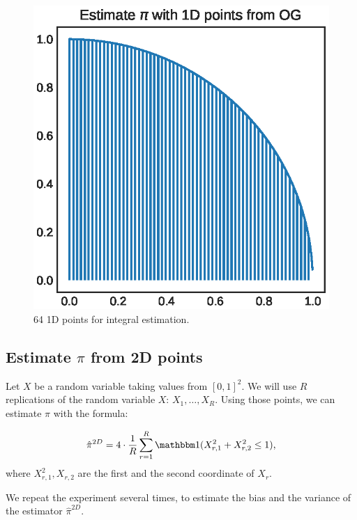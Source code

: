 \documentclass[shortabstract]{iithesis}
\begin{document}
\begin{figure}[!ht]
    \includegraphics[scale=.6]{OG_1D_circle.eps}
    \caption{64 1D points for integral estimation.}
    \label{fig:toy-points2}
\end{figure}





\newpage

\subsection{Estimate $\pi$ from 2D points}


Let $X$ be a random variable taking values from $[0,  1]^2$. We will use $R$ replications of the random variable $X$: $X_1,  \ldots, X_R$. Using those points, we can estimate $\pi$ with the formula:

\begin{equation*}
    \hat{\pi}^{2D} =  4 \cdot \frac 1 R \sum_{r=1}^R \mathbbm 1 (X_{r,  1}^2 + X_{r,  2}^2 \leq 1)\text{,}
\end{equation*}
where $X_{r,  1}^2, X_{r,  2}$ are the first and the second coordinate of $X_r$.


We repeat the experiment several times, to estimate the bias and the variance of the estimator $ \hat{\pi}^{2D}$. 
\end{document}
